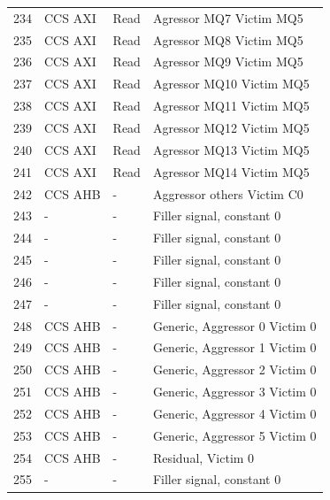 \begin{center}
\begin{longtable}{|l|l|l|l|}
234 & CCS AXI & Read &  Agressor MQ7 Victim MQ5\\
235 & CCS AXI & Read &  Agressor MQ8 Victim MQ5\\
236 & CCS AXI & Read &  Agressor MQ9 Victim MQ5\\
237 & CCS AXI & Read &  Agressor MQ10 Victim MQ5\\
238 & CCS AXI & Read &  Agressor MQ11 Victim MQ5\\
239 & CCS AXI & Read &  Agressor MQ12 Victim MQ5\\
240 & CCS AXI & Read &  Agressor MQ13 Victim MQ5\\
241 & CCS AXI & Read &  Agressor MQ14 Victim MQ5\\
242 & CCS AHB & - &   Aggressor others Victim C0 \\
243 & - & - &   Filler signal, constant 0 \\
244 & - & - &   Filler signal, constant 0 \\
245 & - & - &   Filler signal, constant 0 \\
246 & - & - &   Filler signal, constant 0 \\
247 & - & - &   Filler signal, constant 0 \\
248 & CCS AHB & - &   Generic, Aggressor 0 Victim 0\\
249 & CCS AHB & - &   Generic, Aggressor 1 Victim 0 \\
250 & CCS AHB & - &   Generic, Aggressor 2 Victim 0 \\
251 & CCS AHB & - &   Generic, Aggressor 3 Victim 0 \\
252 & CCS AHB & - &   Generic, Aggressor 4 Victim 0 \\
253 & CCS AHB & - &   Generic, Aggressor 5 Victim 0 \\
254 & CCS AHB & - &   Residual, Victim 0  \\
255 & - & - &   Filler signal, constant 0 \\
	\end{longtable}
\end{center}

